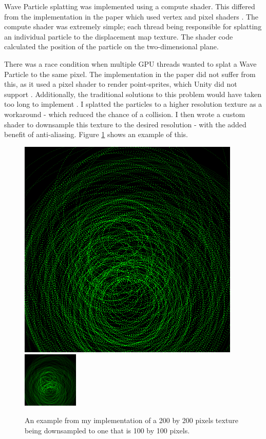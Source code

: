 \documentclass[12pt,a4paper,twoside]{report}
\begin{document}
Wave Particle splatting was implemented using a compute shader. This differed
from the implementation in the paper which used vertex and pixel shaders
\cite{Yuksel2007}. The compute shader was extremely simple; each thread being
responsible for splatting an individual particle to the displacement map
texture. The shader code calculated the position of the particle on the
two-dimensional plane.



There was a race condition when multiple GPU threads wanted to splat a Wave
Particle to the same pixel. The implementation in the paper did not suffer from
this, as it used a pixel shader to render point-sprites, which Unity did not
support \cite{NoPointSpritesUnityOne} \cite{NoPointSpritesUnityTwo}.
Additionally, the traditional solutions to this problem would have taken too
long to implement \cite{NoPointSpritesWorkaround}. I splatted the particles to
a higher resolution texture as a workaround - which reduced the chance of a
collision. I then wrote a custom shader to downsample this texture to the
desired resolution - with the added benefit of anti-aliasing. Figure
\ref{fig:downscale_example} shows an example of this.

\begin{figure}[h]
\centering
\includegraphics[width=0.6\linewidth]{splat_particles_large}
\includegraphics[width=0.3\linewidth]{splat_particles_downscale}
\caption{An example from my implementation of a 200 by 200 pixels texture being
downsampled to one that is 100 by 100 pixels.}
\label{fig:downscale_example}
\end{figure}
\end{document}
